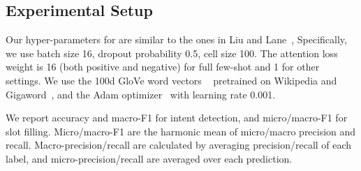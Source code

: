 

\subsection{Experimental Setup}
Our hyper-parameters for \BLSTM are similar to the ones in Liu and Lane~,
Specifically, we use batch size 16, dropout probability 0.5, \BLSTM cell size 100.
The attention loss weight is 16 (both positive and negative) for full few-shot and 1 for other settings.
We use the 100d GloVe word vectors ~\cite{pennington2014glove} pretrained on Wikipedia and Gigaword~\cite{parker2011english}, and the Adam optimizer~\cite{kingma2014adam} with learning rate 0.001.

We report accuracy and macro-F1 for intent detection, and micro/macro-F1 for slot filling.
Micro/macro-F1 are the harmonic mean of micro/macro precision and recall.
Macro-precision/recall are calculated by averaging precision/recall of each label, and micro-precision/recall are averaged over each prediction.

